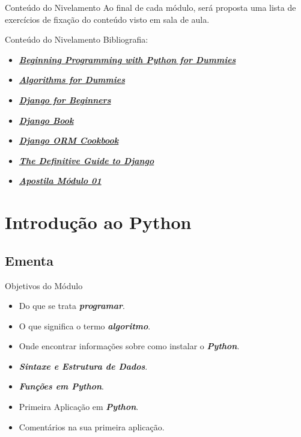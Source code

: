 \documentclass{beamer}
\begin{document}
\begin{frame}{Conteúdo do Nivelamento}
	Ao final de cada módulo, será proposta uma lista de exercícios de fixação do conteúdo visto em sala de aula.
\end{frame}

\begin{frame}{Conteúdo do Nivelamento}
	Bibliografia:
	\begin{itemize}
		\item \href{bibliografia/Beginning Programming with Python for Dummies.pdf}{\textbf{\textit{Beginning Programming with Python for Dummies}}}
		\item \href{bibliografia/Algorithms For Dummies.pdf}{\textbf{\textit{Algorithms for Dummies}}}
		\item \href{bibliografia/django-for-beginners-build-websites-with-python-amp-django_compress.pdf}{\textbf{\textit{Django for Beginners}}}
		\item \href{https://django-book.readthedocs.io/en/latest/}{\textbf{\textit{Django Book}}}
		\item \href{https://books.agiliq.com/projects/django-orm-cookbook/en/latest/}{\textbf{\textit{Django ORM Cookbook}}}
		\item \href{bibliografia/The Definitive Guide to Django - Apress.pdf}{\textbf{\textit{The Definitive Guide to Django}}}
		\item \href{bibliografia/Apostila_Mdulo_01.pdf}{\textbf{\textit{Apostila Módulo 01}}}
	\end{itemize}
\end{frame}

\section{Introdução ao Python}
\subsection{Ementa}
\begin{frame}{Objetivos do Módulo}
\begin{itemize}
	\item Do que se trata \textbf{\textit{programar}}.
	\item O que significa o termo \textbf{\textit{algoritmo}}.
	\item Onde encontrar informações sobre como instalar o \textbf{\textit{Python}}.
	\item \textbf{\textit{Sintaxe e Estrutura de Dados}}.
	\item \textbf{\textit{Funções em Python}}.
	\item Primeira Aplicação em \textbf{\textit{Python}}.
	\item Comentários na sua primeira aplicação.
\end{itemize}
\end{frame}
\end{document}
